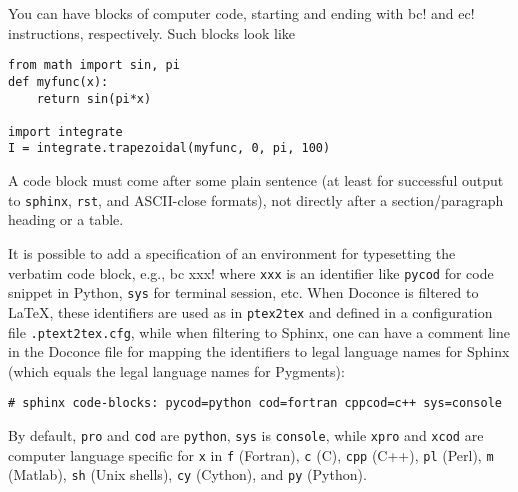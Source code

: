 \documentclass[%
oneside,                 %
final,                   %
10pt]{article}
\begin{document}
You can have blocks of computer code, starting and ending with
{\fontsize{10pt}{10pt}\Verb!!bc!} and {\fontsize{10pt}{10pt}\Verb!!ec!} instructions, respectively. Such blocks look like
\providecommand{\shadedskip}{}
\renewenvironment{shadedskip}{
\def\FrameCommand{\colorbox{shadecolor}}\FrameRule0.6pt
\MakeFramed {\FrameRestore}\vskip3mm}{\vskip0mm\endMakeFramed}
\providecommand{\shadedquoteBlue}{}
\renewenvironment{shadedquoteBlue}[1][]{
\bgroup\rmfamily
\fboxsep=0mm\relax
\begin{shadedskip}
\list{}{\parsep=-2mm\parskip=0mm\topsep=0pt\leftmargin=2mm
\rightmargin=2\leftmargin\leftmargin=4pt\relax}
\item\relax}
{\endlist\end{shadedskip}\egroup}\begin{shadedquoteBlue}
\fontsize{9pt}{9pt}
\begin{Verbatim}
from math import sin, pi
def myfunc(x):
    return sin(pi*x)

import integrate
I = integrate.trapezoidal(myfunc, 0, pi, 100)
\end{Verbatim}
\end{shadedquoteBlue}
\noindent
A code block must come after some plain sentence (at least for successful
output to {\fontsize{10pt}{10pt}\Verb!sphinx!}, {\fontsize{10pt}{10pt}\Verb!rst!}, and ASCII-close formats),
not directly after a section/paragraph heading or a table.

It is possible to add a specification of an
environment for typesetting the verbatim code block, e.g., {\fontsize{10pt}{10pt}\Verb!!bc xxx!}
where {\fontsize{10pt}{10pt}\Verb!xxx!} is an identifier like {\fontsize{10pt}{10pt}\Verb!pycod!} for code snippet in Python,
{\fontsize{10pt}{10pt}\Verb!sys!} for terminal session, etc. When Doconce is filtered to {\LaTeX},
these identifiers are used as in {\fontsize{10pt}{10pt}\Verb!ptex2tex!} and defined in a
configuration file {\fontsize{10pt}{10pt}\Verb!.ptext2tex.cfg!}, while when filtering
to Sphinx, one can have a comment line in the Doconce file for
mapping the identifiers to legal language names for Sphinx (which equals
the legal language names for Pygments):
\begin{Verbatim}[fontsize=\fontsize{9pt}{9pt},tabsize=8,baselinestretch=0.85,
fontfamily=tt,xleftmargin=7mm]
# sphinx code-blocks: pycod=python cod=fortran cppcod=c++ sys=console
\end{Verbatim}
\noindent
By default, {\fontsize{10pt}{10pt}\Verb!pro!} and {\fontsize{10pt}{10pt}\Verb!cod!} are {\fontsize{10pt}{10pt}\Verb!python!}, {\fontsize{10pt}{10pt}\Verb!sys!} is {\fontsize{10pt}{10pt}\Verb!console!},
while {\fontsize{10pt}{10pt}\Verb!xpro!} and {\fontsize{10pt}{10pt}\Verb!xcod!} are computer language specific for {\fontsize{10pt}{10pt}\Verb!x!}
in {\fontsize{10pt}{10pt}\Verb!f!} (Fortran), {\fontsize{10pt}{10pt}\Verb!c!} (C), {\fontsize{10pt}{10pt}\Verb!cpp!} (C++), {\fontsize{10pt}{10pt}\Verb!pl!} (Perl), {\fontsize{10pt}{10pt}\Verb!m!} (Matlab),
{\fontsize{10pt}{10pt}\Verb!sh!} (Unix shells), {\fontsize{10pt}{10pt}\Verb!cy!} (Cython), and {\fontsize{10pt}{10pt}\Verb!py!} (Python).
\end{document}
